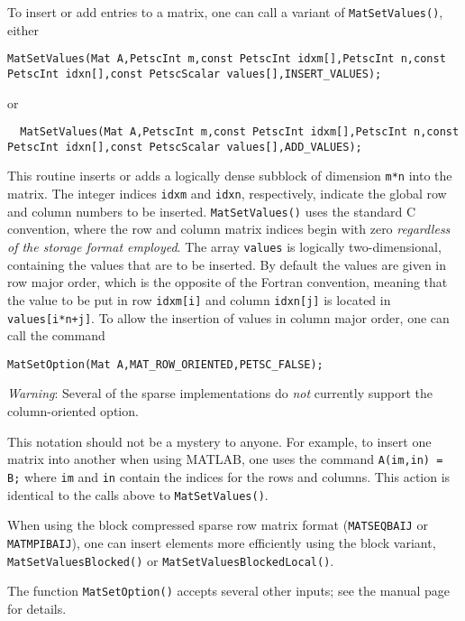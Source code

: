 To insert or add entries to a matrix, one can call a variant of \lstinline{MatSetValues()}, either
\begin{lstlisting}
MatSetValues(Mat A,PetscInt m,const PetscInt idxm[],PetscInt n,const PetscInt idxn[],const PetscScalar values[],INSERT_VALUES);
\end{lstlisting}
or
\begin{lstlisting}
  MatSetValues(Mat A,PetscInt m,const PetscInt idxm[],PetscInt n,const PetscInt idxn[],const PetscScalar values[],ADD_VALUES);
\end{lstlisting}
This routine inserts or adds a logically dense subblock of dimension
\lstinline{m*n} into the
matrix. The integer indices \lstinline{idxm} and \lstinline{idxn}, respectively, indicate the
global row and column numbers to be inserted.  \lstinline{MatSetValues()} uses the
standard C convention, where the row and column matrix indices begin with
zero {\em regardless of the storage format employed}.   The array
\lstinline{values} is logically two-dimensional, containing the values that are
to be inserted. By default the values are given in row major order, which is the
opposite of the Fortran convention, meaning that the value to be put in row
\lstinline{idxm[i]} and column \lstinline{idxn[j]} is located in \lstinline{values[i*n+j]}. To
allow the insertion of values in column major order, one can call the command
\begin{lstlisting}
MatSetOption(Mat A,MAT_ROW_ORIENTED,PETSC_FALSE);
\end{lstlisting}
{\em Warning}: Several of the sparse implementations do {\em not} currently
support the column-oriented option.

This notation should not be a mystery to anyone. For example,
to insert one matrix into another when using MATLAB, one uses the command
\lstinline{A(im,in) = B;} where \lstinline{im} and \lstinline{in} contain the indices for the
rows and columns. This action is identical to the calls above to
\lstinline{MatSetValues()}.

When using the block compressed sparse row matrix format (\lstinline{MATSEQBAIJ} or
\lstinline{MATMPIBAIJ}), one can insert elements more efficiently using the block
variant, \lstinline{MatSetValuesBlocked()} or \break\lstinline{MatSetValuesBlockedLocal()}.

The function \lstinline{MatSetOption()} accepts several other inputs; see
the manual page for details.

